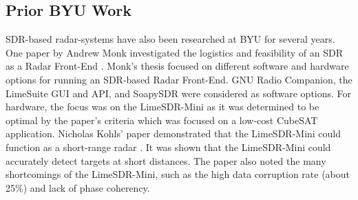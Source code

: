 \subsection{Prior BYU Work}
\label{sec:prior_byu_work}
SDR-based radar-systems have also been researched at BYU for several years.
One paper by Andrew Monk investigated the logistics and feasibility of an SDR as a Radar Front-End \cite{monk_exploration_2020}.
Monk's thesis focused on different software and hardware options for running an SDR-based Radar Front-End.
GNU Radio Companion, the LimeSuite GUI and API, and SoapySDR were considered as software options.
For hardware, the focus was on the LimeSDR-Mini as it was determined to be optimal by the paper's criteria
which was focused on a low-cost CubeSAT application. %
Nicholas Kohls' paper demonstrated that the LimeSDR-Mini
could function as a short-range radar \cite{kohls_software_2021}.
It was shown that the LimeSDR-Mini could accurately detect targets at short distances.
The paper also noted the many shortcomings of the LimeSDR-Mini, such as
the high data corruption rate (about 25\%) and lack of phase coherency.
